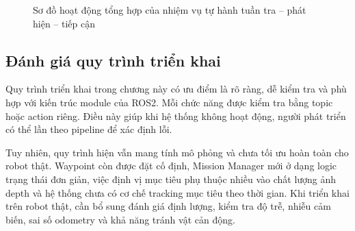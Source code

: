 \begin{figure}[H]
\centering
{}
\caption{Sơ đồ hoạt động tổng hợp của nhiệm vụ tự hành tuần tra -- phát hiện -- tiếp cận}
\label{fig:mission-overall-flow}
\end{figure}

\subsection{Đánh giá quy trình triển khai}
\label{subsec:deployment-assessment}

Quy trình triển khai trong chương này có ưu điểm là rõ ràng, dễ kiểm tra và phù hợp với kiến trúc module của ROS2. Mỗi chức năng được kiểm tra bằng topic hoặc action riêng. Điều này giúp khi hệ thống không hoạt động, người phát triển có thể lần theo pipeline để xác định lỗi.

Tuy nhiên, quy trình hiện vẫn mang tính mô phỏng và chưa tối ưu hoàn toàn cho robot thật. Waypoint còn được đặt cố định, Mission Manager mới ở dạng logic trạng thái đơn giản, việc định vị mục tiêu phụ thuộc nhiều vào chất lượng ảnh depth và hệ thống chưa có cơ chế tracking mục tiêu theo thời gian. Khi triển khai trên robot thật, cần bổ sung đánh giá định lượng, kiểm tra độ trễ, nhiễu cảm biến, sai số odometry và khả năng tránh vật cản động.

